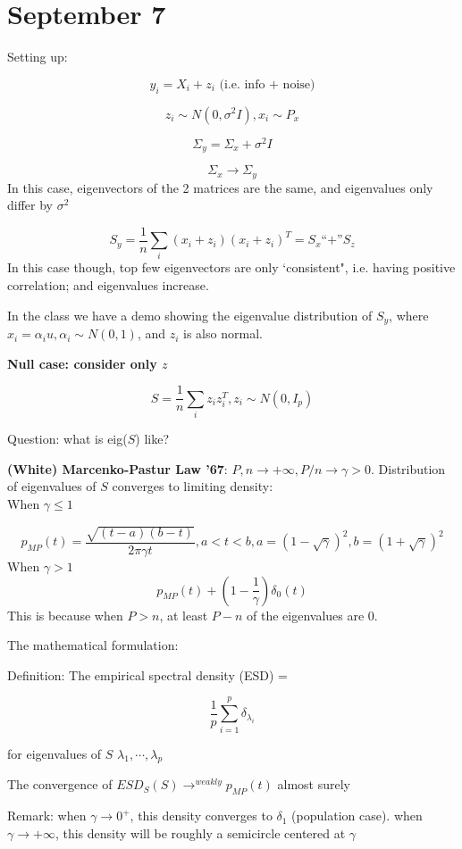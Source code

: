 \documentclass[12pt]{article}
\theoremstyle{plain}
\begin{document}
\part*{September 7}

Setting up:

$$ y_i = X_i + z_i \text{ (i.e. info + noise)} $$

$$ z_i \sim N(0, \sigma^2I), x_i \sim P_x $$

$$ \Sigma_y = \Sigma_x + \sigma^2 I $$

$$ \Sigma_x \rightarrow \Sigma_y $$
In this case, eigenvectors of the 2 matrices are the same, and eigenvalues only differ by $\sigma^2$

$$ S_y = \frac{1}{n} \sum_i (x_i + z_i ) (x_i + z_i)^T = S_x \text{``+''} S_z $$
In this case though, top few eigenvectors are only `consistent", i.e. having positive correlation; and eigenvalues increase.

In the class we have a demo showing the eigenvalue distribution of $S_y$, where $x_i = \alpha_i u, \alpha_i \sim N(0,1)$, and $z_i$ is also normal.

\textbf{Null case: consider only $z$}

$$ S = \frac{1}{n} \sum_i z_i z_i^T , z_i \sim N(0, I_p) $$

Question: what is eig($S$) like?

\textbf{(White) Marcenko-Pastur Law '67}: $ P, n \rightarrow + \infty, P/n \rightarrow \gamma > 0 $. Distribution of eigenvalues of $S$ converges to limiting density:\\
When $\gamma \leq 1$

$$p_{MP} (t) = \frac{\sqrt{(t-a)(b-t)}}{2\pi \gamma t}, a < t < b, a = (1-\sqrt{\gamma})^2 , b = (1+\sqrt{\gamma})^2$$
When  $\gamma > 1$
$$p_{MP} (t) + (1-\frac{1}{\gamma})\delta_0(t)$$
This is because when $P > n$, at least $P-n$ of the eigenvalues are 0.

The mathematical formulation:

Definition: The empirical spectral density (ESD) =

$$ \frac{1}{p} \sum_{i=1}^p \delta_{\lambda_i} $$

for eigenvalues of $S$ $\lambda_1 , \cdots, \lambda_p$

The convergence of $ESD_S(S) \rightarrow^{weakly} p_{MP} (t)$ almost surely

Remark: when $\gamma \rightarrow 0^+$, this density converges to $\delta_1$ (population case). when $\gamma \rightarrow +\infty$, this density will be roughly a semicircle centered at $\gamma$
\end{document}
